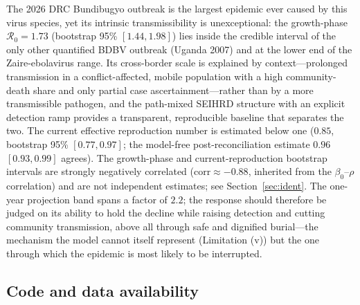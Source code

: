 \documentclass[10pt]{plos}
\newcommand{\Reff}{\mathcal{R}}
\begin{document}
The 2026 DRC Bundibugyo outbreak is the largest epidemic ever caused by
this virus species, yet its intrinsic transmissibility is unexceptional:
the growth-phase $\Reff_0=1.73$ (bootstrap 95\% $[1.44,1.98]$) lies
inside the credible interval of the only other quantified BDBV outbreak
(Uganda 2007) and at the lower end of the Zaire-ebolavirus range. Its
cross-border scale is explained by context---prolonged transmission in a
conflict-affected, mobile population with a high community-death share
and only partial case ascertainment---rather than by a more
transmissible pathogen, and the path-mixed SEIHRD structure with an
explicit detection ramp provides a transparent, reproducible baseline
that separates the two. The current effective reproduction number is
estimated below one ($0.85$, bootstrap 95\% $[0.77,0.97]$; the
model-free post-reconciliation estimate $0.96$ $[0.93,0.99]$ agrees).
The growth-phase and current-reproduction bootstrap intervals are strongly
negatively correlated ($\mathrm{corr}\approx-0.88$, inherited from the
$\beta_0$--$\rho$ correlation) and are not independent estimates; see
Section~\ref{sec:ident}.
The one-year projection band spans a factor of $2.2$; the response
should therefore be judged on its ability to hold the decline while
raising detection and cutting community transmission, above all through
safe and dignified burial---the mechanism the model cannot itself
represent (Limitation (v)) but the one through which the epidemic is
most likely to be interrupted.
\subsection{Code and data availability}\label{sec:availability}
\end{document}

